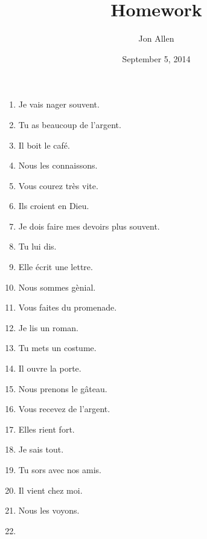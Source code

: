 \documentclass[letterpaper]{article}
\begin{document}
\title{Homework}
\date{September 5, 2014}
\author{Jon Allen}
\maketitle
\begin{enumerate}
\item
Je vais nager souvent.
\item
Tu as beaucoup de l'argent.
\item
Il boit le café.
\item
Nous les connaissons.
\item
Vous courez très vite.
\item
Ils croient en Dieu.
\item
Je dois faire mes devoirs plus souvent.
\item
Tu lui dis.
\item
Elle écrit une lettre.
\item
Nous sommes gènial.
\item
Vous faites du promenade.
\item
Je lis un roman.
\item
Tu mets un costume.
\item
Il ouvre la porte.
\item
Nous prenons le gâteau.
\item
Vous recevez de l'argent.
\item
Elles rient fort.
\item
Je sais tout.
\item
Tu sors avec nos amis.
\item
Il vient chez moi.
\item
Nous les voyons.
\item
\end{enumerate}
\end{document}
